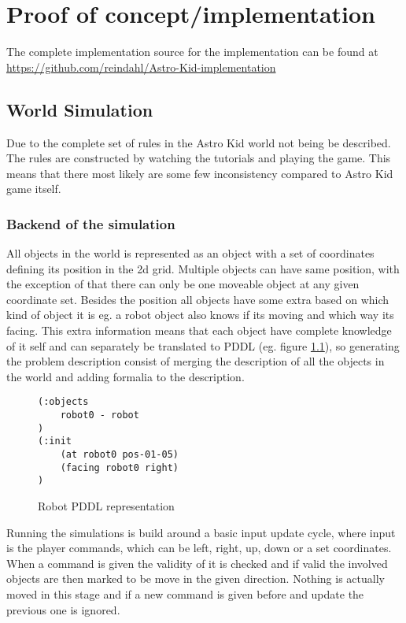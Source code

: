 \chapter{Proof of concept/implementation}
The complete implementation source for the implementation can be found at  \url{https://github.com/reindahl/Astro-Kid-implementation}
\section{World Simulation}
	Due to the complete set of rules in the Astro Kid world not being be described. The rules are constructed by watching the tutorials and playing the game. This means that there most likely are some few inconsistency compared to Astro Kid game itself.


	\subsection{Backend of the simulation}
	All objects in the world is represented as an object with a set of coordinates defining its position in the 2d grid. Multiple objects can have same position, with the exception of that there can only be one moveable object at any given coordinate set. Besides the position all objects have some extra based on which kind of object it is eg. a robot object also knows if its moving and which way its facing. This extra information means that each object have complete knowledge of it self and can separately be translated to PDDL (eg. figure \ref{robotpddl}), so generating the problem description consist of merging the description of all the objects  in the world and adding formalia to the description.
	\begin{figure}
	\caption{Robot PDDL representation}
	\label{robotpddl}
	\begin{lstlisting}
(:objects
	robot0 - robot
)
(:init
	(at robot0 pos-01-05)
	(facing robot0 right)
)
	\end{lstlisting}
	
		\end{figure}
	Running the simulations is build around a basic input update cycle, where input is the player commands, which can be left, right, up, down or a set coordinates. When a command is given the validity of it is checked and if valid the involved objects are then marked to be move in the given direction. Nothing is actually moved in this stage and if a new command is given before and update the previous one is ignored.
	
